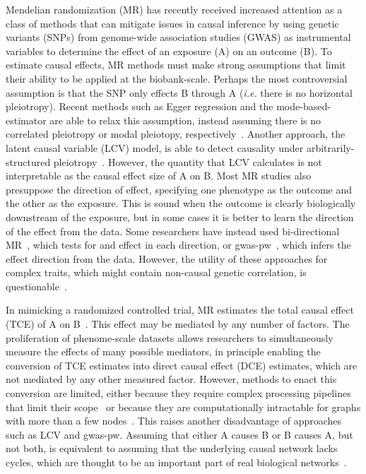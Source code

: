 \documentclass{article}
\begin{document}
Mendelian randomization (MR) has recently received increased attention as a class of methods
that can mitigate issues in causal inference
 by using genetic variants (SNPs) from genome-wide
association studies (GWAS) as instrumental variables to determine the effect
of an exposure (A) on an outcome (B). To estimate causal effects,
MR methods must make strong assumptions that limit their
ability to be applied at the biobank-scale. Perhaps the most
controversial assumption is that the SNP only effects B through A
(\textit{i.e.} there is no horizontal pleiotropy). Recent methods such as Egger
regression and the mode-based-estimator are able to relax this assumption, instead
assuming there is no correlated pleiotropy or modal pleiotopy, respectively~\cite{Bowden2015,Hartwig2017}.
Another approach, the latent causal variable (LCV) model, is able to detect causality
under arbitrarily-structured pleiotropy~\cite{OConnor2018}. However, the quantity that LCV
calculates is not interpretable as the causal effect size of A on B. Most MR studies
also presuppose the direction of effect, specifying one phenotype as the outcome and
the other as the exposure. This is sound when the outcome
is clearly biologically downstream of the exposure, but in some cases it is better
to learn the direction of the effect from the data.
Some researchers have instead used bi-directional MR~\cite{Timpson2011, Richmond2014}, which tests for
and effect in each direction, or gwas-pw~\cite{Pickrell2016}, which infers the effect
direction from the data.
However, the utility of these approaches for complex traits,
which might contain non-causal genetic correlation,
is questionable~\cite{OConnor2018}.

In mimicking a randomized controlled trial, MR estimates the
total causal effect (TCE) of A on B~\cite{Burgess2015}. This effect may be mediated by
any number of factors. The proliferation of phenome-scale datasets
allows researchers to simultaneously measure the effects of many possible mediators,
in principle enabling the conversion of TCE estimates into direct causal effect (DCE)
estimates, which are not mediated by any other measured factor.
However, methods to enact this conversion are limited, either because they require complex
processing pipelines that limit their scope~\cite{Amar2019} or because they are
computationally intractable for graphs with more than a few nodes~\cite{Badsha2019}.
This raises another disadvantage of approaches such as LCV and gwas-pw. Assuming that either
A causes B or B causes A, but not both, is equivalent to assuming
that the underlying causal network
lacks cycles, which are thought to be an important part of real biological networks~\cite{Zhu2007}.
\end{document}
